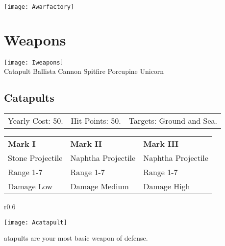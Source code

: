 \begin{center}
    \texttt{[image: Awarfactory]} %
\end{center}

\section{\textsf{Weapons}}


\begin{center}
    \texttt{[image: Iweapons]} %
    \\ Catapult Ballista Cannon Spitfire Porcupine Unicorn
\end{center}

\clearpage  %

\subsection{\textsf{Catapults}}


\begin{tabular}{p{1.264in} p{1.264in} p{1.264in}}
Yearly Cost: 50. & Hit-Points: 50. & Targets: Ground and Sea.
\end{tabular}

\begin{tabular}{|p{1.264in} p{1.264in} p{1.264in}|}
    \hline
    \textbf{Mark I}    & \textbf{Mark II} & \textbf{Mark III} \\
    Stone Projectile & Naphtha Projectile & Naphtha Projectile \\
    Range 1-7 & Range 1-7& Range 1-7 \\
    Damage Low & Damage Medium & Damage High \\
    \hline
\end{tabular}

\begin{wrapfigure}{r}{0.6\textwidth}
    \vspace{-20pt}
    \begin{center}
        \texttt{[image: Acatapult]} %
    \end{center}
    \vspace{-20pt}
\end{wrapfigure}

atapults are your most basic weapon of defense. 

